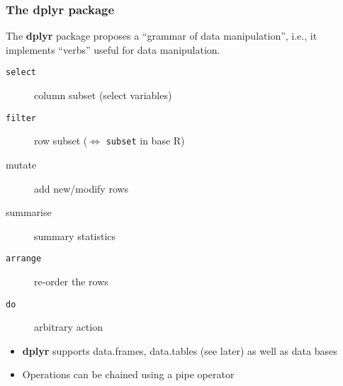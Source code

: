 \documentclass[paper=screen,mathserif]{beamer}\usepackage[]{graphicx}\usepackage[]{color}
\makeatletter
\newcommand{\hlnum}[1]{\textcolor[rgb]{0.686,0.059,0.569}{#1}}%
\newcommand{\hlopt}[1]{\textcolor[rgb]{0,0,0}{#1}}%
\newcommand{\hlstd}[1]{\textcolor[rgb]{0.345,0.345,0.345}{#1}}%
\newcommand{\hlkwc}[1]{\textcolor[rgb]{0.333,0.667,0.333}{#1}}%
\newcommand{\hlkwd}[1]{\textcolor[rgb]{0.737,0.353,0.396}{\textbf{#1}}}%
\newenvironment{kframe}{%
 \def\at@end@of@kframe{}%
 \ifinner\ifhmode%
  \def\at@end@of@kframe{\end{minipage}}%
  \begin{minipage}{\columnwidth}%
 \fi\fi%
 \def\FrameCommand##1{\hskip\@totalleftmargin \hskip-\fboxsep
 \colorbox{shadecolor}{##1}\hskip-\fboxsep
     \hskip-\linewidth \hskip-\@totalleftmargin \hskip\columnwidth}%
 \MakeFramed {\advance\hsize-\width
   \@totalleftmargin\z@ \linewidth\hsize
   \@setminipage}}%
 {\par\unskip\endMakeFramed%
 \at@end@of@kframe}
\newenvironment{knitrout}{}{} %
\newcommand{\ft}[1]{\frametitle{#1}}
\makeatother
\begin{document}
\begin{frame}
  \ft{The {\bf dplyr} package} 
  
  The {\bf dplyr} package proposes a ``grammar of data manipulation'',
  i.e., it implements ``verbs'' useful for data manipulation.
  
  \begin{description}
  \item[{\tt select}] column subset (select variables)
  \item[{\tt filter}] row subset ($\Leftrightarrow$ {\tt subset} in
    base R)
  \item[mutate] add new/modify rows
  \item[summarise] summary statistics
  \item[{\tt arrange}] re-order the rows
  \item[{\tt do}] arbitrary action
  \end{description}
  
  \begin{itemize}
  \item {\bf dplyr} supports data.frames, data.tables (see later) as
    well as data bases
  \item Operations can be chained using a pipe operator
  \end{itemize}
  
\end{frame}

\end{document}
